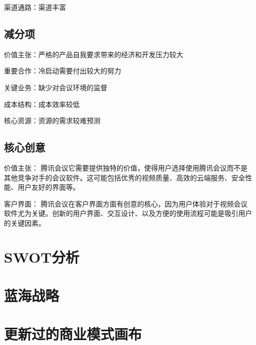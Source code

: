 \documentclass[a4paper,12pt]{article}
\begin{document}
    渠道通路：渠道丰富
    
    \subsection{减分项}
    价值主张：严格的产品⾃我要求带来的经济和开发压⼒较⼤
    
    重要合作：冷启动需要付出较⼤的努⼒
    
    关键业务：缺少对会议环境的监督
    
    成本结构：成本效率较低
    
    核⼼资源：资源的需求较难预测

    \subsection{核心创意}

    价值主张： 腾讯会议它需要提供独特的价值，使得用户选择使用腾讯会议而不是其他竞争对手的会议软件。这可能包括优秀的视频质量、高效的云端服务、安全性能、用户友好的界面等。
    
    客户界面： 腾讯会议在客户界面方面有创意的核心，因为用户体验对于视频会议软件尤为关键。创新的用户界面、交互设计、以及方便的使用流程可能是吸引用户的关键因素。
    
    

    \section{SWOT分析}
    

    \section{蓝海战略}
    

    \section{更新过的商业模式画布}
   

    
\end{document}
